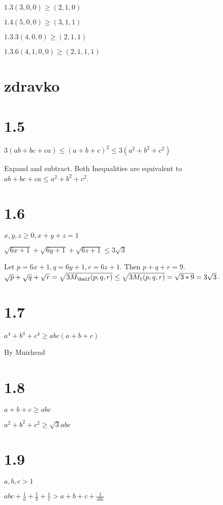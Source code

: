 \documentclass{article}
\begin{document}
$1.3 (3, 0, 0) \ge (2, 1, 0)$

$1.4 (5, 0, 0) \ge (3, 1, 1)$

$1.3.3 (4, 0, 0) \ge (2, 1, 1)$

$1.3.6 (4, 1, 0, 0) \ge (2, 1, 1, 1)$

\section*{zdravko}

\section*{1.5}

$3(ab + bc + ca) \le (a + b + c)^2 \le 3(a^2 + b^2 + c^2)$

Expand and subtract. Both Inequalities are equivalent to $ab + bc + ca \le a^2 + b^2 + c^2$.

\section*{1.6}

$x, y, z \ge 0, x + y + z = 1$

$\sqrt{6x + 1} + \sqrt{6y + 1} + \sqrt{6z + 1} \le 3 \sqrt 3$

Let $p = 6x+1, q = 6y+1, r = 6z+1$. Then $p + q + r = 9$. $\sqrt p + \sqrt q + \sqrt r = \sqrt{3 M_\half (p, q, r)} \le \sqrt{3 M_1(p, q, r)} = \sqrt{3*9} = 3\sqrt 3$.

\section*{1.7}

$a^4 + b^4 + c^4 \ge abc(a + b + c)$

By Muirhead

\section*{1.8}

$a + b + c \ge abc$

$a^2 + b^2 + c^2 \ge \sqrt{3} abc$

\section*{1.9}

$a, b, c > 1$

$abc + \frac{1}{a} + \frac{1}{b} + \frac{1}{c} > a + b + c + \frac{1}{abc}$
\end{document}
